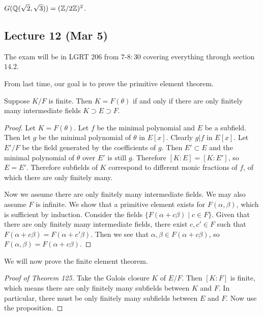 \documentclass[10pt, twoside]{article}
\begin{document}
        \begin{exm} $G(\mathbb{Q}(\sqrt{2}, \sqrt{3})) = (\mathbb{Z}/2\mathbb{Z})^2$.  \end{exm}

        \subsection{Lecture 12 (Mar 5)}
        
        The exam will be in LGRT $206$ from $7$-$8:30$ covering everything
        through section $14.2$.
        
        From last time, our goal is to prove the primitive element theorem.

        \begin{prop} Suppose $K/F$ is finite. Then $K = F(\theta)$ if and only
            if there are only finitely many intermediate fields $K \supset E
            \supset F$.  \begin{proof} Let $K = F(\theta)$. Let $f$ be the
                minimal polynomial and $E$ be a subfield. Then let $g$ be the
                minimal polynomial of $\theta$ in $E[x]$. Clearly $g | f$ in
                $E[x]$. Let $E'/F$ be the field generated by the coefficients
                of $g$. Then $E' \subset E$ and the minimal polynomial of
                $\theta$ over $E'$ is still $g$. Therefore $[K:E] = [K:E']$, so
                $E = E'$. Therefore subfields of $K$ correspond to different
                monic fractions of $f$, of which there are only finitely many.

                Now we assume there are only finitely many intermediate fields.
            We may also assume $F$ is infinite. We show that a primitive
        element exists for $F(\alpha, \beta)$, which is sufficient by
    induction. Consider the fields $\{F(\alpha+c\beta) \mid c \in F\}$. Given
that there are only finitely many intermediate fields, there exist $c,c' \in F$
such that $F(\alpha+c\beta) = F(\alpha+c'\beta)$. Then we see that
$\alpha,\beta \in F(\alpha+c\beta)$, so $F(\alpha, \beta) = F(\alpha+c\beta)$.
\end{proof} \end{prop}

        We will now prove the finite element theorem.  \begin{proof}[Proof of
            Theorem 125] Take the Galois closure $K$ of $E/F$. Then $[K:F]$ is
            finite, which means there are only finitely many subfields between
            $K$ and $F$. In particular, there must be only finitely many
            subfields between $E$ and $F$. Now use the proposition.
        \end{proof}
\end{document}
